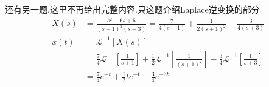 \documentclass[12pt, a4paper, oneside]{ctexart}
\begin{document}
还有另一题,这里不再给出完整内容.只这题介绍Laplace逆变换的部分
\begin{align*}
    X(s) &= \frac{s^2+6s+6}{(s+1)^2(s+3)} = \frac{7}{4(s+1)}+\frac{1}{2(s+1)^2}-\frac{3}{4(s+3)}\\
    x(t) &= \mathcal{L}^{-1}\left[X(s)\right]\\
    &= \frac{7}{4}\mathcal{L}^{-1}\left[\frac{1}{s+1}\right]+\frac{1}{2}\mathcal{L}^{-1}\left[\frac{1}{(s+1)^2}\right]
    -\frac{3}{4}\mathcal{L}^{-1}\left[\frac{1}{s+3}\right]\\
    &= \frac{7}{4}e^{-t} + \frac{1}{2}te^{-t} - \frac{3}{4}e^{-3t}
\end{align*}
\end{document}
